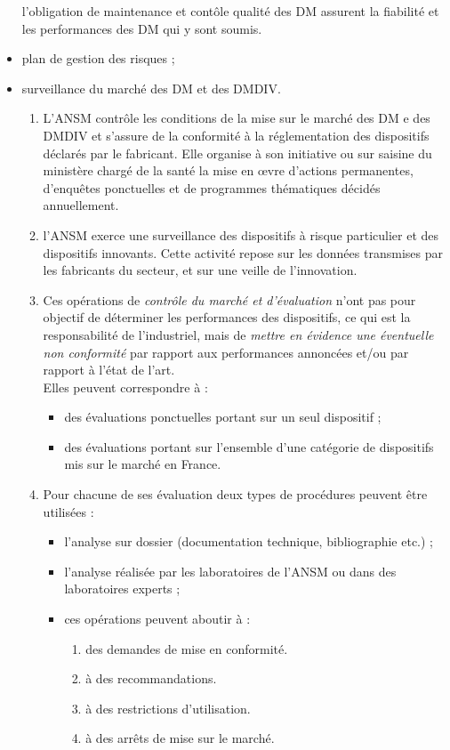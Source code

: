 \documentclass[a4paper,11pt]{article}
\newcounter{exe}
\begin{document}
\begin{sloppypar}
\begin{itemize}
 l'obligation de maintenance et contôle qualité des DM assurent la fiabilité et les performances des DM qui y sont soumis.
 \item plan de gestion des risques ;
 \item surveillance du marché des DM et des DMDIV.
 \begin{enumerate}
 \item L'ANSM contrôle les conditions de la mise sur le marché des DM e des DMDIV et s'assure de la conformité à la réglementation des dispositifs déclarés par le fabricant.
 Elle organise à son initiative ou sur saisine du ministère chargé de la santé la mise en \oe vre d'actions permanentes, d'enquêtes ponctuelles et de programmes thématiques décidés annuellement.
 \item l'ANSM exerce une surveillance des dispositifs à risque particulier et des dispositifs innovants. Cette activité repose sur les données transmises par les fabricants
du secteur, et sur une veille de l'innovation.
\item Ces opérations de \emph{contrôle du marché et d'évaluation} n'ont pas pour objectif de déterminer les performances des dispositifs, ce qui est la responsabilité
de l'industriel, mais de \emph{mettre en évidence une éventuelle non conformité} par rapport aux performances annoncées et/ou par rapport à l'état de l'art.\\
Elles peuvent correspondre à :
\begin{itemize}
  \item des évaluations ponctuelles portant sur un seul dispositif ;
  \item des évaluations portant sur l'ensemble d'une catégorie de dispositifs mis sur le marché en France.
\end{itemize}
  \item Pour chacune de ses évaluation deux types de procédures peuvent être utilisées :
  \begin{itemize}
    \item l'analyse sur dossier (documentation technique, bibliographie etc.) ;
    \item l'analyse réalisée par les laboratoires de l'ANSM ou dans des laboratoires experts ;
    \item ces opérations peuvent aboutir à :
    \begin{enumerate}
     \item des demandes de mise en conformité.
     \item à des recommandations.
     \item à des restrictions d'utilisation.
     \item à des arrêts de mise sur le marché.
   \end{enumerate}
  \end{itemize}
\end{enumerate}
\end{itemize}


\end{sloppypar}
\end{document}
